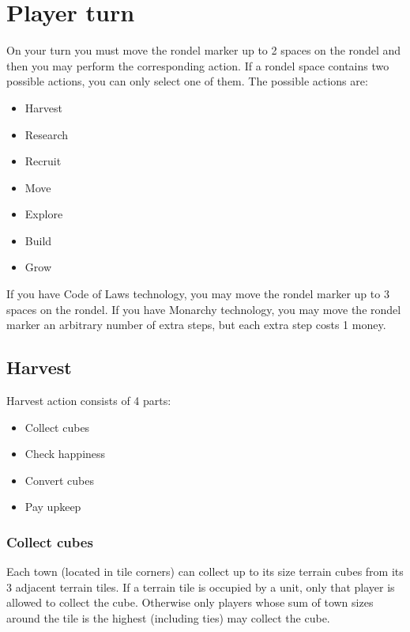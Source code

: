 \documentclass[11pt,a4paper,titlepage]{article}
\begin{document}
\section{Player turn}{
  On your turn you must move the rondel marker up to 2 spaces on the rondel
  and then you may perform the corresponding action. If a rondel space contains
  two possible actions, you can only select one of them. The possible actions
  are:
  \begin{itemize}
  \item Harvest
  \item Research
  \item Recruit
  \item Move
  \item Explore
  \item Build
  \item Grow
  \end{itemize}

  \noindent
  If you have Code of Laws technology, you may move the rondel marker up to
  3 spaces on the rondel. If you have Monarchy technology, you may move the
  rondel marker an arbitrary number of extra steps, but each extra step costs
  1 money.

  \subsection{Harvest}{
    Harvest action consists of 4 parts:
    \begin{itemize}
    \item Collect cubes
    \item Check happiness
    \item Convert cubes
    \item Pay upkeep
    \end{itemize}

    \subsubsection{Collect cubes}{
      Each town (located in tile corners) can collect up to its size terrain
      cubes from its 3 adjacent terrain tiles. If a terrain tile is occupied
      by a unit, only that player is allowed to collect the cube. Otherwise
      only players whose sum of town sizes around the tile is the highest
      (including ties) may collect the cube.

}}}
\end{document}
